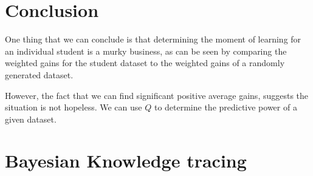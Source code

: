 \documentclass[11pt,letterpaper]{article}
\begin{document}
\section{Conclusion}

One thing that we can conclude is that determining the
moment of learning for an individual student is a murky
business, as can be seen by comparing the weighted gains for
the student dataset to the weighted gains of a 
randomly generated dataset.

However, the fact that we can find significant positive average gains,
suggests the situation is not hopeless.  We can use $Q$ to determine
the predictive power of a given dataset. 


\appendix
\section{Bayesian Knowledge tracing}
\label{bkt}
\end{document}

